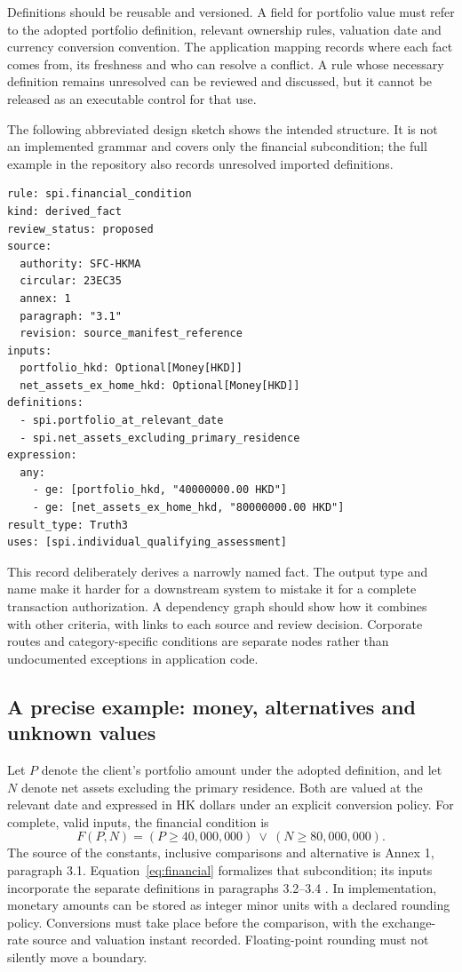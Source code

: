 Definitions should be reusable and versioned. A field for portfolio value must
refer to the adopted portfolio definition, relevant ownership rules, valuation
date and currency conversion convention. The application mapping records where
each fact comes from, its freshness and who can resolve a conflict. A rule whose
necessary definition remains unresolved can be reviewed and discussed, but it
cannot be released as an executable control for that use.

The following abbreviated design sketch shows the intended structure. It is not
an implemented grammar and covers only the financial subcondition; the full
example in the repository also records unresolved imported definitions.

\begin{lstlisting}[caption={Proposed rule record for a narrow SPI subcondition.}]
rule: spi.financial_condition
kind: derived_fact
review_status: proposed
source:
  authority: SFC-HKMA
  circular: 23EC35
  annex: 1
  paragraph: "3.1"
  revision: source_manifest_reference
inputs:
  portfolio_hkd: Optional[Money[HKD]]
  net_assets_ex_home_hkd: Optional[Money[HKD]]
definitions:
  - spi.portfolio_at_relevant_date
  - spi.net_assets_excluding_primary_residence
expression:
  any:
    - ge: [portfolio_hkd, "40000000.00 HKD"]
    - ge: [net_assets_ex_home_hkd, "80000000.00 HKD"]
result_type: Truth3
uses: [spi.individual_qualifying_assessment]
\end{lstlisting}

This record deliberately derives a narrowly named fact. The output type and
name make it harder for a downstream system to mistake it for a complete
transaction authorization. A dependency graph should show how it combines with
other criteria, with links to each source and review decision. Corporate routes
and category-specific conditions are separate nodes rather than undocumented
exceptions in application code.

\subsection{A precise example: money, alternatives and unknown values}
\label{sec:semantics}

Let $P$ denote the client's portfolio amount under the adopted definition, and
let $N$ denote net assets excluding the primary residence. Both are valued at the
relevant date and expressed in HK dollars under an explicit conversion policy.
For complete, valid inputs, the financial condition is
\begin{equation}
 F(P,N)=(P\geq 40{,}000{,}000)\ \lor\ (N\geq 80{,}000{,}000).
 \label{eq:financial}
\end{equation}
The source of the constants, inclusive comparisons and alternative is Annex 1,
paragraph 3.1. Equation~\eqref{eq:financial} formalizes that subcondition; its
inputs incorporate the separate definitions in paragraphs 3.2--3.4
\citep{sfcspiannex1}. In implementation, monetary amounts can be stored as
integer minor units with a declared rounding policy. Conversions must take place
before the comparison, with the exchange-rate source and valuation instant
recorded. Floating-point rounding must not silently move a boundary.

